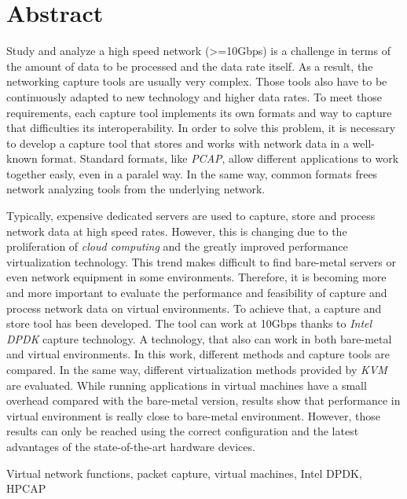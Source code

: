 \chapter*{Abstract}

\begin{abstractEn}
Study and analyze a high speed network (>=10Gbps) is a challenge in terms of the amount of data to be processed and the data rate itself. As a result, the networking capture tools are usually very complex. Those tools also have to be continuously adapted to new technology and higher data rates. To meet those requirements, each capture tool implements its own formats and way to capture that difficulties its interoperability. In order to solve this problem, it is necessary to develop a capture tool that stores and works with network data in a well-known format. Standard formats, like \textit{PCAP}, allow different applications to work together easly, even in a paralel way. In the same way, common formats frees network analyzing tools from the underlying network.

Typically, expensive dedicated servers are used to capture, store and process network data at high speed rates. However, this is changing due to the proliferation of \textit{cloud computing} and the greatly improved performance virtualization technology. This trend makes difficult to find bare-metal servers or even network equipment in some environments. Therefore, it is becoming more and more important to evaluate the performance and feasibility of capture and process network data on virtual environments. To achieve that, a capture and store tool has been developed.
The tool can work at 10Gbps thanks to \textit{Intel DPDK} capture technology. A technology, that also can work in both bare-metal and virtual environments.
In this work, different methods and capture tools are compared. In the same way, different virtualization methods provided by \textit{KVM} are evaluated.
While running applications in virtual machines have a small overhead compared with the bare-metal version, results show that performance in virtual environment is really close to bare-metal environment. However, those results can only be reached using the correct configuration and the latest advantages of the state-of-the-art hardware devices.
\end{abstractEn}

\begin{keywordsEn}
Virtual network functions, packet capture, virtual machines, Intel DPDK, HPCAP
\end{keywordsEn}


